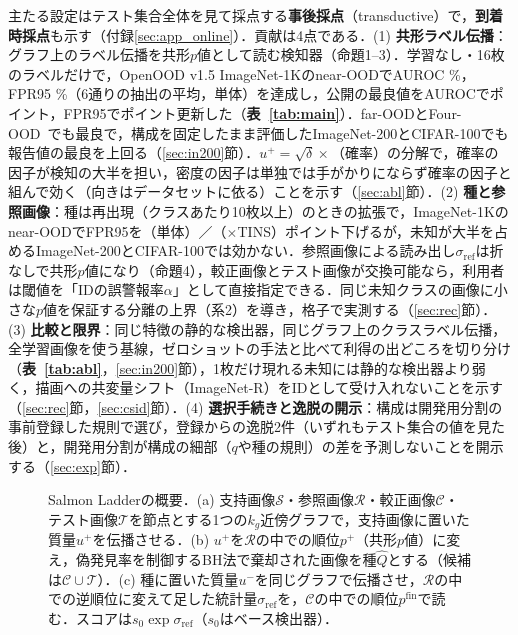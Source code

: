 \documentclass[MIRU,submit]{miru2025j}
\renewcommand\tabref[1]{\textbf{表~\ref{tab:#1}}}   %
\newcommand\secref[1]{\ref{sec:#1}節}
\newcommand\AUC{AUROC}
\newcommand\FPR{FPR95}
\newcommand\pfin{p^{\mathrm{fin}}}
\newcommand\sR{\sigma_{\mathrm{ref}}}
\begin{document}
主たる設定はテスト集合全体を見て採点する\textbf{事後採点}（transductive）で，\textbf{到着時採点}も示す（付録\ref{sec:app_online}）．貢献は4点である．(1) \textbf{共形ラベル伝播}：グラフ上のラベル伝播を共形$p$値として読む検知器（命題1--3）．学習なし・16枚のラベルだけで，OpenOOD v1.5 ImageNet-1Kのnear-OODで\AUC{} \NRAloneNearAuroc\%，\FPR{} \NRAloneNearFpr\%（6通りの抽出の平均，単体）を達成し，公開の最良値を\AUC{}で\NRAloneGapNearAuroc{}ポイント，\FPR{}で\NRAloneGapNearFpr{}ポイント更新した（\tabref{main}）．far-OODとFour-OOD~\cite{huang2021mos}でも最良で，構成を固定したまま評価したImageNet-200とCIFAR-100でも報告値の最良を上回る（\secref{in200}）．$u^{+}=\sqrt{\delta}\times$（確率）の分解で，確率の因子が検知の大半を担い，密度の因子は単独では手がかりにならず確率の因子と組んで効く（向きはデータセットに依る）ことを示す（\secref{abl}）．(2) \textbf{種と参照画像}：種は再出現（クラスあたり10枚以上）のときの拡張で，ImageNet-1Kのnear-OODで\FPR{}を\NRvsLpAloneNearDAbs{}（単体）／\NRvsLpTinsNearDAbs{}（$\times$TINS）ポイント下げるが，未知が大半を占めるImageNet-200とCIFAR-100では効かない．参照画像による読み出し$\sR$は折なしで共形$p$値になり（命題4），較正画像とテスト画像が交換可能なら，利用者は閾値を「IDの誤警報率$\alpha$」として直接指定できる．同じ未知クラスの画像に小さな$p$値を保証する分離の上界（系2）を導き，格子で実測する（\secref{rec}）．(3) \textbf{比較と限界}：同じ特徴の静的な検出器，同じグラフ上のクラスラベル伝播，全学習画像を使う基線，ゼロショットの手法と比べて利得の出どころを切り分け（\tabref{abl}，\secref{in200}），1枚だけ現れる未知には静的な検出器より弱く，描画への共変量シフト（ImageNet-R）をIDとして受け入れないことを示す（\secref{rec}，\secref{csid}）．(4) \textbf{選択手続きと逸脱の開示}：構成は開発用分割の事前登録した規則で選び，登録からの逸脱2件（いずれもテスト集合の値を見た後）と，開発用分割が構成の細部（$q$や種の規則）の差を予測しないことを開示する（\secref{exp}）．

\begin{figure}[t]
\centering
\scalebox{0.76}{}
\caption{Salmon Ladderの概要．(a) 支持画像$\mathcal{S}$・参照画像$\mathcal{R}$・較正画像$\mathcal{C}$・テスト画像$\mathcal{T}$を節点とする1つの$k_g$近傍グラフで，支持画像に置いた質量$u^{+}$を伝播させる．(b) $u^{+}$を$\mathcal{R}$の中での順位$p^{+}$（共形$p$値）に変え，偽発見率を制御するBH法で棄却された画像を種$\hat{Q}$とする（候補は$\mathcal{C}\cup\mathcal{T}$）．(c) 種に置いた質量$u^{-}$を同じグラフで伝播させ，$\mathcal{R}$の中での逆順位に変えて足した統計量$\sR$を，$\mathcal{C}$の中での順位$\pfin$で読む．スコアは$s_0\exp\sR$（$s_0$はベース検出器）．}
\label{fig:overview}
\end{figure}
\end{document}
